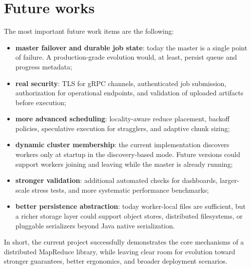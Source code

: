 \documentclass{scrartcl}
\begin{document}
\section{Future works}\label{future-works}
The most important future work items are the following:
%
\begin{itemize}
    \item \textbf{master failover and durable job state}: today the master is a single point of failure. A production-grade evolution would, at least, persist queue and progress metadata;
    \item \textbf{real security}: TLS for gRPC channels, authenticated job submission, authorization for operational endpoints, and validation of uploaded artifacts before execution;
    \item \textbf{more advanced scheduling}: locality-aware reduce placement, backoff policies, speculative execution for stragglers, and adaptive chunk sizing;
    \item \textbf{dynamic cluster membership}: the current implementation discovers workers only at startup in the discovery-based mode. Future versions could support workers joining and leaving while the master is already running;
    \item \textbf{stronger validation}: additional automated checks for dashboards, larger-scale stress tests, and more systematic performance benchmarks;
    \item \textbf{better persistence abstraction}: today worker-local files are sufficient, but a richer storage layer could support object stores, distributed filesystems, or pluggable serializers beyond Java native serialization.
\end{itemize}

In short, the current project successfully demonstrates the core mechanisms of a distributed MapReduce library, while leaving clear room for evolution toward stronger guarantees, better ergonomics, and broader deployment scenarios.



\end{document}
